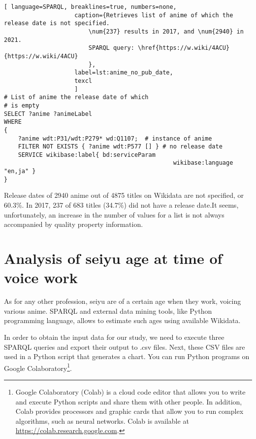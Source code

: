 \begin{lstlisting}[ language=SPARQL, breaklines=true, numbers=none,
                    caption={Retrieves list of anime of which the release date is not specified.
                        \num{237} results in 2017, and \num{2940} in 2021.
                        SPARQL query: \href{https://w.wiki/4ACU}{https://w.wiki/4ACU}
                        },
                    label=lst:anime_no_pub_date,
                    texcl 
                    ]
# List of anime the release date of which
# is empty
SELECT ?anime ?animeLabel
WHERE
{
    ?anime wdt:P31/wdt:P279* wd:Q1107;  # instance of anime
    FILTER NOT EXISTS { ?anime wdt:P577 [] } # no release date
    SERVICE wikibase:label{ bd:serviceParam
			  									wikibase:language "en,ja" }
}
\end{lstlisting}%

Release dates of \num{2940} anime out of \num{4875} titles on Wikidata are not specified, or \num{60.3}\%. In 2017, \num{237} of \num{683} titles (\num{34.7}\%) did not have a release date.It seems, unfortunately, an increase in the number of values for a list is not always accompanied by quality property information.

\section{Analysis of seiyu age at time of voice work}

As for any other profession, seiyu are of a certain age when they work, voicing various anime. 
SPARQL and external data mining tools, 
like Python%
programming language, 
allows to estimate such ages using available Wikidata.


In order to obtain the input data for our study, 
we need to execute three SPARQL queries and export their output to .csv%
files. Next, these CSV files are used in a Python script that generates a chart. 
You can run Python programs on Google Colaboratory\footnote{Google Colaboratory (Colab) is a cloud code editor that allows you to write and execute Python scripts and share them with other people. In addition, Colab provides processors and graphic cards that allow you to run complex algorithms, such as neural networks. Colab is available at \href{https://colab.research.google.com}{https://colab.research.google.com}.}.

